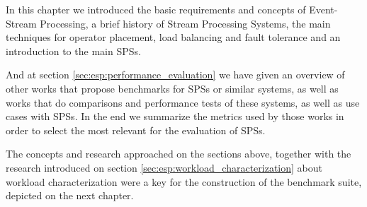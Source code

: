 \documentclass[ppgc,diss,english]{iiufrgs}
\begin{document}
In this chapter we introduced the basic requirements and concepts of Event-Stream Processing, a brief history of Stream Processing Systems, the main techniques for operator placement, load balancing and fault tolerance and an introduction to the main SPSs.

And at section \ref{sec:esp:performance_evaluation} we have given an overview of other works that propose benchmarks for SPSs or similar systems, as well as works that do comparisons and performance tests of these systems, as well as use cases with SPSs. In the end we summarize the metrics used by those works in order to select the most relevant for the evaluation of SPSs.

The concepts and research approached on the sections above, together with the research introduced on section \ref{sec:esp:workload_characterization} about workload characterization were a key for the construction of the benchmark suite, depicted on the next chapter.
\end{document}
